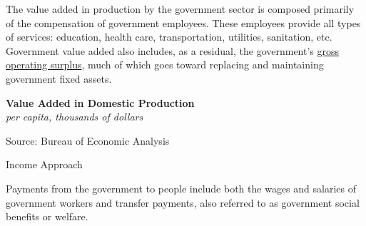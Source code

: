 \documentclass{report}
\makeatletter
\newcommand{\tbllink}[1]{\href{https://raw.githubusercontent.com/bdecon/US-chartbook/master/chartbook/data/#1}{\faTable}}
\newcommand*\short[1]{\expandafter\@gobbletwo\number\numexpr#1\relax}
\newcommand{\absnode}[3]{\node[below right, align=left] at (axis cs: #1,#2) {#3};}
\newcommand{\shdateaxisticks}{
		date coordinates in=x, axis line style={draw=none},
		xmax={2023-11-30},
		max space between ticks=40,	    
		xtick={{1990-01-01}, {1995-01-01}, {2000-01-01}, 
			{2005-01-01}, {2010-01-01}, {2015-01-01}, {2020-01-01}},
		minor xtick={},
		enlarge y limits={0.06}, enlarge x limits={0.01},
		xticklabel style={align=center, yshift=-2pt}, tick label style={inner sep=0pt},
		}
\newcommand{\bbar}[2]{extra #1 ticks = {{#2}}, extra #1 tick labels = ,
		extra #1 tick style = {grid=major, grid style={thick, black!25}},}
\newcommand{\stdline}[4]{\addplot[very thick, no markers, color=#1] 
		table [x=#2, y=#3, col sep=comma] {#4};	}
\newcommand{\rebars}{
		\fill[color=black!10] (axis cs:{2007-12-01},\pgfkeysvalueof{/pgfplots/ymin}) rectangle 
			(axis cs:{2009-07-01}, \pgfkeysvalueof{/pgfplots/ymax});
		\fill[color=black!10] (axis cs:{2001-03-01},\pgfkeysvalueof{/pgfplots/ymin}) rectangle 
			(axis cs:{2001-11-01}, \pgfkeysvalueof{/pgfplots/ymax});
		\fill[color=black!10] (axis cs:{2020-02-01},\pgfkeysvalueof{/pgfplots/ymin}) rectangle 
			(axis cs:{2020-05-01}, \pgfkeysvalueof{/pgfplots/ymax});}
\makeatother
\begin{document}
{\begin{minipage}{0.76\textwidth}
\small The value added in production by the government sector is composed primarily of the compensation of government employees. These employees provide all types of services: education, health care, transportation, utilities, sanitation, etc. Government value added also includes, as a residual, the government's \href{https://www.bea.gov/help/glossary/gross-operating-surplus}{gross operating surplus}, much of which goes toward replacing and maintaining government fixed assets. 
\end{minipage}
\vspace{1mm}

\begin{minipage}{0.375\textwidth}
\normalsize \textbf{Value Added in Domestic Production}\\
\footnotesize{\textit{per capita, thousands of dollars}}
\vspace{3.0cm}

\hspace{1mm} 

\footnotesize{Source: Bureau of Economic Analysis} \hfill \tbllink{gdpva_pc.csv}
\end{minipage} \hspace{4mm}
\begin{minipage}{0.35\textwidth}
\small 
\end{minipage}
\newpage
{}
\begin{minipage}{0.76\textwidth}    
\normalsize Income Approach
\vspace{-1mm}

\small Payments from the government to people include both the wages and salaries of government workers and transfer payments, also referred to as government social benefits or welfare.


\end{minipage}}
\end{document}
